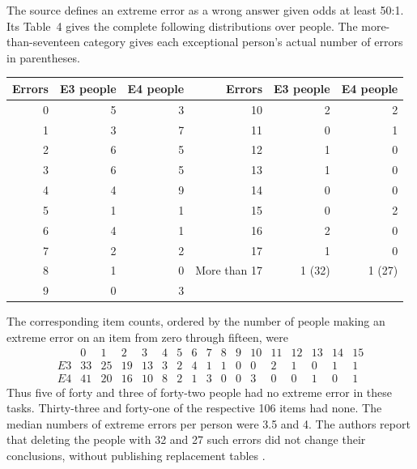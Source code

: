 The source defines an extreme error as a wrong answer given odds at least
50:1. Its Table~4 gives the complete following distributions over people.
The more-than-seventeen category gives each exceptional person's actual
number of errors in parentheses.
\begin{center}\small
\begin{tabular}{r|rr@{\qquad}r|rr}
Errors&E3 people&E4 people&Errors&E3 people&E4 people\\\hline
0&5&3&10&2&2\\
1&3&7&11&0&1\\
2&6&5&12&1&0\\
3&6&5&13&1&0\\
4&4&9&14&0&0\\
5&1&1&15&0&2\\
6&4&1&16&2&0\\
7&2&2&17&1&0\\
8&1&0&More than 17&1 (32)&1 (27)\\
9&0&3&&&
\end{tabular}
\end{center}
The corresponding item counts, ordered by the number of people making an
extreme error on an item from zero through fifteen, were
\[
\begin{array}{c|rrrrrrrrrrrrrrrr}
 &0&1&2&3&4&5&6&7&8&9&10&11&12&13&14&15\\\hline
E3&33&25&19&13&3&2&4&1&1&0&0&2&1&0&1&1\\
E4&41&20&16&10&8&2&1&3&0&0&3&0&0&1&0&1
\end{array}
\]
Thus five of forty and three of forty-two people had no extreme error in
these tasks. Thirty-three and forty-one of the respective 106 items had
none. The median numbers of extreme errors per person were 3.5 and 4.
The authors report that deleting the people with 32 and 27 such errors
did not change their conclusions, without publishing replacement tables
\cite[pp.~560--561]{FischhoffSlovicLichtenstein1977Certainty}.

